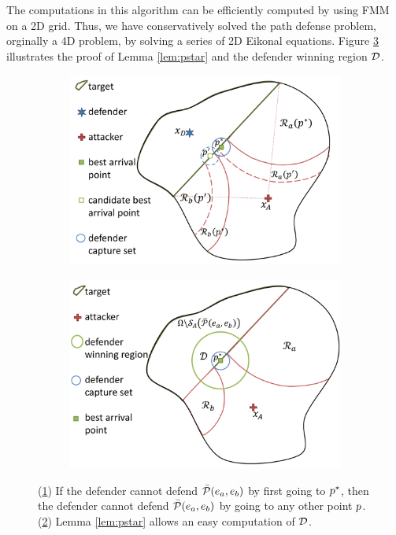 The computations in this algorithm can be efficiently computed by using FMM \cite{Sethian1996} on a 2D grid. Thus, we have conservatively solved the path defense problem, orginally a 4D problem, by solving a series of 2D Eikonal equations. Figure \ref{fig:lemma2} illustrates the proof of Lemma \ref{lem:pstar} and the defender winning region $\mathcal{D}$.
\begin{figure}
\centering
	\centering
	\begin{subfigure}{0.35\textwidth}
	\includegraphics[width=\textwidth]{"fig/best point pstar"}
	\caption{\label{subfig:pstar}}
	\end{subfigure}
	\begin{subfigure}{0.35\textwidth}
	\centering
	\includegraphics[width=\textwidth]{"fig/defender winning pd"}
	\caption{\label{subfig:dregion}}
	\end{subfigure}
	\caption{(\ref{subfig:pstar}) If the defender cannot defend $\bar{\mathcal{P}}(e_a,e_b)$ by first going to $p^*$, then the defender cannot defend $\bar{\mathcal{P}}(e_a,e_b)$ by going to any other point $p$. (\ref{subfig:dregion}) Lemma \ref{lem:pstar} allows an easy computation of $\mathcal{D}$.}
	\label{fig:lemma2}
\end{figure}


